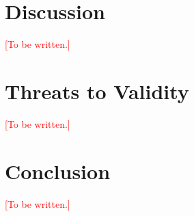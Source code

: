 \documentclass[conference]{IEEEtran}
\newcommand{\todo}[1]{\textcolor{red}{[#1]}}
\begin{document}
\section{Discussion}\label{sec:discussion}
\todo{To be written.}

\section{Threats to Validity}\label{sec:threats}
\todo{To be written.}

\section{Conclusion}\label{sec:conclusion}
\todo{To be written.}



\end{document}
